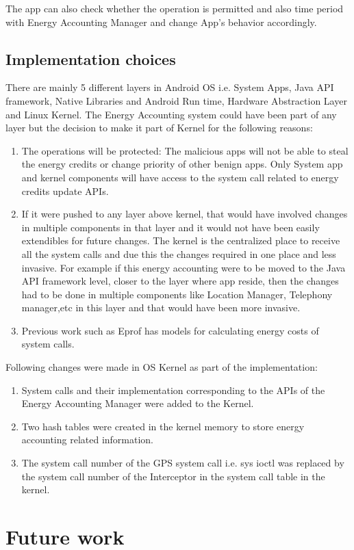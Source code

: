 The app can also check whether the operation is permitted and also time period with Energy Accounting Manager and change App's behavior accordingly. 



\subsection{Implementation choices}

There are mainly 5 different layers in Android OS i.e. System Apps, Java API framework, Native Libraries and Android Run time, Hardware Abstraction Layer and Linux Kernel. The Energy Accounting system could have been part of any layer but the decision to make it part of Kernel for the following reasons:

\begin{enumerate}

\item The operations will be protected: The malicious apps will not be able to steal the energy credits or change priority of other benign apps. Only System app and kernel components will have access to the system call related to energy credits update APIs.

\item If it were pushed to any layer above kernel, that would have involved changes in multiple components in that layer and it would not have been easily extendibles for future changes. The kernel is the centralized place to receive all the system calls and due this the changes required in one place and less invasive. For example if this energy accounting were to be moved to the Java API framework level, closer to the layer where app reside, then the changes had to be done in multiple components like Location Manager, Telephony manager,etc in this layer and that would have been more invasive.

\item Previous work such as Eprof has models for calculating energy costs of system calls. 

\end{enumerate}

Following changes were made in OS Kernel as part of the implementation:

\begin{enumerate}

\item System calls and their implementation corresponding to the APIs of the Energy Accounting Manager were added to the Kernel.
\item Two hash tables were created in the kernel memory to store energy accounting related information.
\item The system call number of the GPS system call i.e. sys ioctl was replaced by the system call number of the Interceptor in the system call table in the kernel.

\end{enumerate}

\section{Future work}

